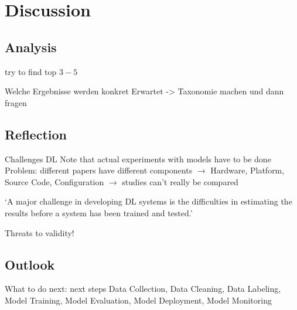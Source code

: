 \chapter{Discussion}\label{ch:discussion}
\section{Analysis}
try to find top $3-5$

Welche Ergebnisse werden konkret Erwartet -> Taxonomie machen und dann fragen



\section{Reflection}
Challenges DL\citep{arpteg_software_2018}
Note that actual experiments with models have to be done
Problem: different papers have different components
$\rightarrow$ Hardware, Platform, Source Code, Configuration
$\rightarrow$ studies can't really be compared

`A major challenge in developing DL systems is the difficulties in estimating
the results before a system has been trained and tested.'~\citep{arpteg_software_2018}

Threats to validity!

\section{Outlook}

What to do next: next steps
Data Collection, Data Cleaning, Data Labeling, Model Training, Model Evaluation, Model Deployment,
Model Monitoring~\cite{watanabe_preliminary_2019}
